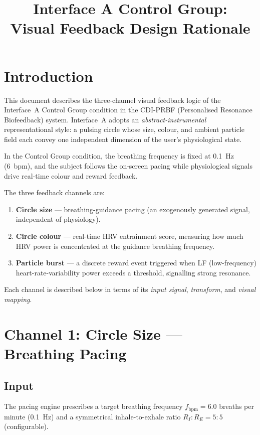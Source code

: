 \documentclass[11pt,a4paper]{article}
\title{Interface A Control Group:\\
Visual Feedback Design Rationale}
\author{}
\date{}
\begin{document}
\maketitle

\section{Introduction}

This document describes the three-channel visual feedback logic of the
Interface~A Control Group condition in the CDI-PRBF (Personalised Resonance
Biofeedback) system. Interface~A adopts an \textit{abstract-instrumental}
representational style: a pulsing circle whose size, colour, and ambient
particle field each convey one independent dimension of the user's
physiological state.

In the Control Group condition, the breathing frequency is fixed at 0.1~Hz
(6~bpm), and the subject follows the on-screen pacing while physiological
signals drive real-time colour and reward feedback.

The three feedback channels are:

\begin{enumerate}
  \item \textbf{Circle size} — breathing-guidance pacing (an exogenously
    generated signal, independent of physiology).
  \item \textbf{Circle colour} — real-time HRV entrainment score, measuring
    how much HRV power is concentrated at the guidance breathing frequency.
  \item \textbf{Particle burst} — a discrete reward event triggered when LF
    (low-frequency) heart-rate-variability power exceeds a threshold,
    signalling strong resonance.
\end{enumerate}

Each channel is described below in terms of its \textit{input signal},
\textit{transform}, and \textit{visual mapping}.

\section{Channel 1: Circle Size — Breathing Pacing}

\subsection{Input}
The pacing engine prescribes a target breathing frequency $f_{\text{bpm}} = 6.0$
breaths per minute (0.1~Hz) and a symmetrical inhale-to-exhale ratio $R_I:R_E
= 5:5$ (configurable).
\end{document}
